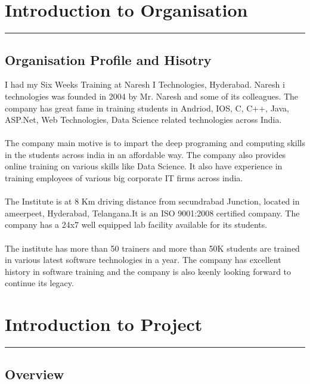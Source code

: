 \chapter{Introduction to Organisation}\hrule
\label{Chapter:1}
\section {Organisation Profile and Hisotry}
I had my Six Weeks Training at Naresh I Technologies, Hyderabad. Naresh i technologies was founded in 2004 by Mr. Naresh and some of its colleagues. The company has great fame in training students in Andriod, IOS, C, C++, Java, ASP.Net, Web Technologies, Data Science related technologies across India.
\\
\\
The company main motive is to impart the deep programing and computing skills in the students across india in an affordable way. The company also provides online training on various skills like Data Science. It also have experience in training employees of various big corporate IT firms across india.\\
\\
The Institute is at 8 Km driving distance from secundrabad Junction, located in ameerpeet, Hyderabad, Telangana.It is an ISO 9001:2008 certified company. The company has a 24x7 well equipped lab facility available for its students.
\\
\\
The institute has more than 50 trainers and more than 50K students are trained in various latest software technologies in a year. The company has excellent history in software training and the company is also keenly looking forward to continue its legacy.


\chapter{Introduction to Project}\hrule
\label{Chapter:2}
\section{Overview}

